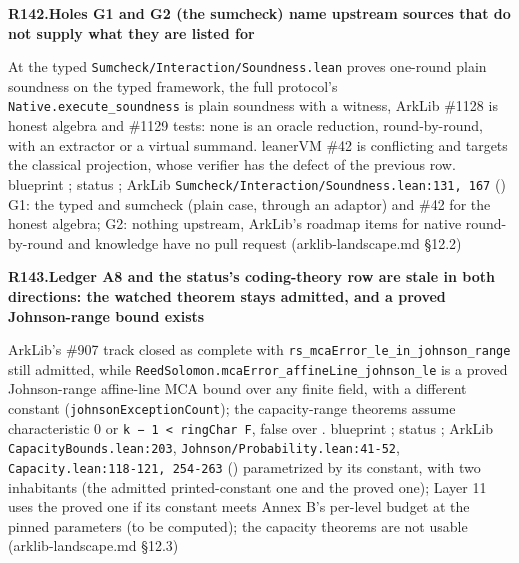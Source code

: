 \par\medskip\noindent\textbf{R142.}\enspace\textbf{Holes G1 and G2 (the sumcheck) name upstream sources that do not supply what they are listed for}\par\nopagebreak
{} At  the typed \texttt{Sumcheck/\allowbreak{}Interaction/\allowbreak{}Soundness.\allowbreak{}lean} proves one-round plain soundness on the typed framework, the full protocol's \texttt{Native.\allowbreak{}execute\_\allowbreak{}soundness} is plain soundness with a  witness, ArkLib \#1128 is honest algebra and \#1129 tests: none is an oracle reduction, round-by-round, with an extractor or a virtual summand. leanerVM \#42 is conflicting and targets the classical projection, whose verifier has the defect of the previous row.
 blueprint ; status ; ArkLib \texttt{Sumcheck/\allowbreak{}Interaction/\allowbreak{}Soundness.\allowbreak{}lean:\allowbreak{}131,\allowbreak{} 167} ()
 G1: the typed  and  sumcheck (plain case, through an adaptor) and \#42 for the honest algebra; G2: nothing upstream, ArkLib's roadmap items for native round-by-round and knowledge have no pull request (arklib-landscape.md §12.2)

\par\medskip\noindent\textbf{R143.}\enspace\textbf{Ledger A8 and the status's coding-theory row are stale in both directions: the watched theorem stays admitted, and a proved Johnson-range bound exists}\par\nopagebreak
{} ArkLib's \#907 track closed as complete with \texttt{rs\_\allowbreak{}mca\allowbreak{}Error\_\allowbreak{}le\_\allowbreak{}in\_\allowbreak{}johnson\_\allowbreak{}range} still admitted, while \texttt{Reed\allowbreak{}Solomon.\allowbreak{}mca\allowbreak{}Error\_\allowbreak{}affine\allowbreak{}Line\_\allowbreak{}johnson\_\allowbreak{}le} is a proved Johnson-range affine-line MCA bound over any finite field, with a different constant (\texttt{johnson\allowbreak{}Exception\allowbreak{}Count}); the capacity-range theorems assume characteristic 0 or \texttt{k − 1 < ring\allowbreak{}Char F}, false over .
 blueprint ; status ; ArkLib \texttt{Capacity\allowbreak{}Bounds.\allowbreak{}lean:\allowbreak{}203}, \texttt{Johnson/\allowbreak{}Probability.\allowbreak{}lean:\allowbreak{}41-\allowbreak{}52}, \texttt{Capacity.\allowbreak{}lean:\allowbreak{}118-\allowbreak{}121,\allowbreak{} 254-\allowbreak{}263} ()
  parametrized by its constant, with two inhabitants (the admitted printed-constant one and the proved one); Layer 11 uses the proved one if its constant meets Annex B's per-level budget at the pinned parameters (to be computed); the capacity theorems are not usable (arklib-landscape.md §12.3)

